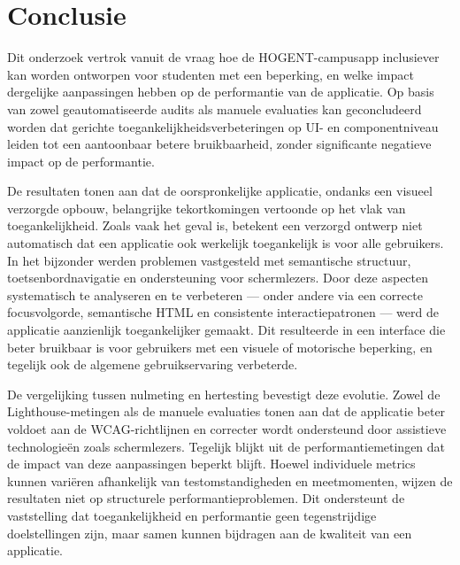 
\chapter{Conclusie}%
\label{ch:conclusie}


Dit onderzoek vertrok vanuit de vraag hoe de HOGENT-campusapp inclusiever kan worden ontworpen voor studenten met een beperking, en welke impact dergelijke aanpassingen hebben op de performantie van de applicatie. Op basis van zowel geautomatiseerde audits als manuele evaluaties kan geconcludeerd worden dat gerichte toegankelijkheidsverbeteringen op UI- en componentniveau leiden tot een aantoonbaar betere bruikbaarheid, zonder significante negatieve impact op de performantie.

De resultaten tonen aan dat de oorspronkelijke applicatie, ondanks een visueel verzorgde opbouw, belangrijke tekortkomingen vertoonde op het vlak van toegankelijkheid. Zoals vaak het geval is, betekent een verzorgd ontwerp niet automatisch dat een applicatie ook werkelijk toegankelijk is voor alle gebruikers. In het bijzonder werden problemen vastgesteld met semantische structuur, toetsenbordnavigatie en ondersteuning voor schermlezers. Door deze aspecten systematisch te analyseren en te verbeteren — onder andere via een correcte focusvolgorde, semantische HTML en consistente interactiepatronen — werd de applicatie aanzienlijk toegankelijker gemaakt. Dit resulteerde in een interface die beter bruikbaar is voor gebruikers met een visuele of motorische beperking, en tegelijk ook de algemene gebruikservaring verbeterde.

De vergelijking tussen nulmeting en hertesting bevestigt deze evolutie. Zowel de Lighthouse-metingen als de manuele evaluaties tonen aan dat de applicatie beter voldoet aan de WCAG-richtlijnen en correcter wordt ondersteund door assistieve technologieën zoals schermlezers. Tegelijk blijkt uit de performantiemetingen dat de impact van deze aanpassingen beperkt blijft. Hoewel individuele metrics kunnen variëren afhankelijk van testomstandigheden en meetmomenten, wijzen de resultaten niet op structurele performantieproblemen. Dit ondersteunt de vaststelling dat toegankelijkheid en performantie geen tegenstrijdige doelstellingen zijn, maar samen kunnen bijdragen aan de kwaliteit van een applicatie.

